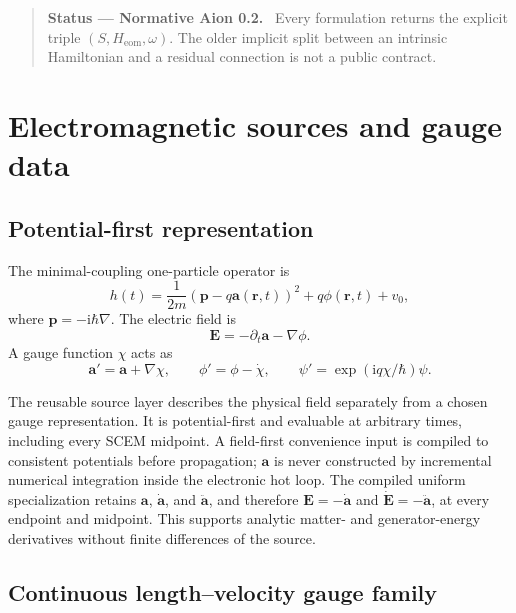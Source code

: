 \documentclass[11pt]{article}
\newcommand{\ii}{\mathrm{i}}
\newcommand{\hH}{H_{\mathrm{eom}}}
\newcommand{\vect}[1]{\bm{#1}}
\newenvironment{statusbox}[1]
  {\begin{quote}\small\textbf{Status --- #1.}\ }
  {\end{quote}}
\begin{document}
\begin{statusbox}{Normative Aion 0.2}
Every formulation returns the explicit triple
\((S,\hH,\omega)\). The older implicit split between an intrinsic
Hamiltonian and a residual connection is not a public contract.
\end{statusbox}

\section{Electromagnetic sources and gauge data}

\subsection{Potential-first representation}

The minimal-coupling one-particle operator is
\begin{equation}
 h(t)=\frac{1}{2m}\left(\vect p-q\vect a(\vect r,t)\right)^2
      +q\phi(\vect r,t)+v_0,
 \label{eq:minimal-coupling}
\end{equation}
where \(\vect p=-\ii\hbar\nabla\). The electric field is
\begin{equation}
 \vect E=-\partial_t\vect a-\nabla\phi.
\end{equation}
A gauge function \(\chi\) acts as
\begin{equation}
 \vect a' = \vect a+\nabla\chi,\qquad
 \phi'=\phi-\dot\chi,\qquad
 \psi'=\exp(\ii q\chi/\hbar)\psi.
 \label{eq:gauge-transform}
\end{equation}

The reusable source layer describes the physical field separately from a
chosen gauge representation. It is potential-first and evaluable at arbitrary
times, including every SCEM midpoint. A field-first convenience input is
compiled to consistent potentials before propagation; \(\vect a\) is never
constructed by incremental numerical integration inside the electronic hot
loop.
The compiled uniform specialization retains \(\vect a\), \(\dot{\vect a}\),
and \(\ddot{\vect a}\), and therefore \(\vect E=-\dot{\vect a}\) and
\(\dot{\vect E}=-\ddot{\vect a}\), at every endpoint and midpoint. This
supports analytic matter- and generator-energy derivatives without finite
differences of the source.

\subsection{Continuous length--velocity gauge family}
\end{document}

